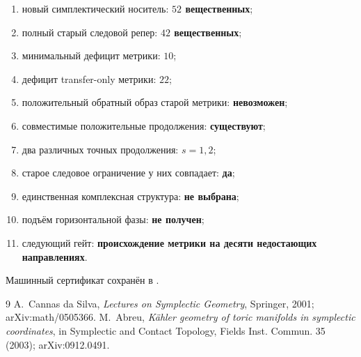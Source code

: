 \begin{protocol}
\begin{enumerate}
 \item новый симплектический носитель: \textbf{$52$ вещественных};
 \item полный старый следовой репер: \textbf{$42$ вещественных};
 \item минимальный дефицит метрики: \textbf{$10$};
 \item дефицит transfer-only метрики: \textbf{$22$};
 \item положительный обратный образ старой метрики: \textbf{невозможен};
 \item совместимые положительные продолжения: \textbf{существуют};
 \item два различных точных продолжения: \textbf{$s=1,2$};
 \item старое следовое ограничение у них совпадает: \textbf{да};
 \item единственная комплексная структура: \textbf{не выбрана};
 \item подъём горизонтальной фазы: \textbf{не получен};
 \item следующий гейт: \textbf{происхождение метрики на десяти недостающих
 направлениях}.
\end{enumerate}
\end{protocol}

Машинный сертификат сохранён в
.

\begin{thebibliography}{9}
A.~Cannas da Silva,
\emph{Lectures on Symplectic Geometry}, Springer, 2001;
arXiv:math/0505366.
M.~Abreu,
\emph{K\"ahler geometry of toric manifolds in symplectic coordinates},
in Symplectic and Contact Topology, Fields Inst. Commun. 35 (2003);
arXiv:0912.0491.
\end{thebibliography}